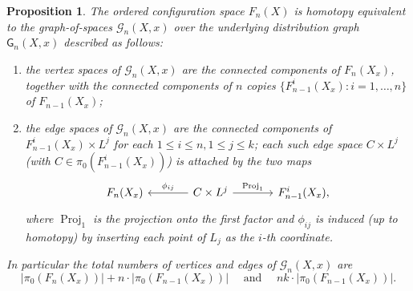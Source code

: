 \documentclass[10pt,a4paper]{amsart}
\newtheorem{proposition}{Proposition}
\newcommand\cG{\mathcal{G}}
\DeclareMathOperator{\proj}{Proj}
\newcommand\sfG{\mathsf{G}}
\begin{document}
\begin{proposition}\label{prop:valency-decomp}
The ordered configuration space \(F_n(X)\) is homotopy equivalent to the \emph{graph-of-spaces}
\(\cG_n(X,x)\) over the underlying \emph{distribution graph} \(\sfG_n(X,x)\) described as follows:
\begin{enumerate}[label=(\roman*),leftmargin=2em]
    \item the vertex spaces of \(\cG_n(X,x)\) are the connected
          components of \(F_n(X_x)\), together with the connected
          components of \(n\) copies
          \(\{F_{n-1}^i(X_x):i=1,\dots,n\}\) of \(F_{n-1}(X_x)\);
    \item the edge spaces of \(\cG_n(X,x)\) are the connected
          components of \(F_{n-1}^i(X_x)\times L^j\) for each \(1\le i\le n, 1\le j\le k\); each such edge space
          \(C\times L^j\) (with \(C\in\pi_0(F_{n-1}^i(X_x))\)) is
          attached by the two maps
          \[
            \begin{tikzcd}[column sep=large]
              F_n(X_x) &
              C\times L^j
                \arrow[l, "\phi_{ij}"']
                \arrow[r, "\proj_1"]
              & F_{n-1}^i(X_x),
            \end{tikzcd}
          \]
          where \(\proj_1\) is the projection onto the
          first factor and \(\phi_{ij}\) is induced (up to homotopy)
          by inserting each point of \(L_j\) as the \(i\)-th
          coordinate.
\end{enumerate}
In particular the total numbers of vertices and edges of
\(\cG_n(X,x)\) are
\[
\bigl|\pi_0(F_n(X_x))\bigr|+n\cdot\bigl|\pi_0(F_{n-1}(X_x))\bigr|
\quad\text{ and }\quad
nk\cdot \bigl|\pi_0(F_{n-1}(X_x))\bigr|.
\]
\end{proposition}
\end{document}
